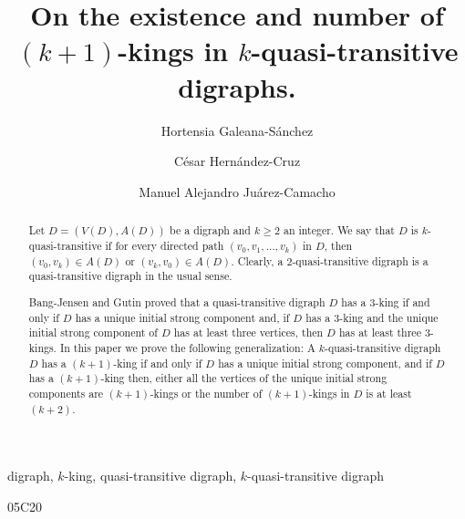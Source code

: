 \documentclass[preprint]{elsarticle}
\begin{document}
\begin{frontmatter}

\title{On the existence and number of $(k+1)$-kings in $k$-quasi-transitive digraphs.}

\author[IMATE]{Hortensia Galeana-S\'anchez}
\author[IMATE]{C\'esar Hern\'andez-Cruz}
\author[FC]{Manuel Alejandro Ju\'arez-Camacho}

\address[IMATE]{Instituto de Matem\'aticas, Universidad Nacional Aut\'onoma de M\'exico, Ciudad Universitaria, C.P. 04510, M\'exico, D.F., M\'exico}
\address[FC]{Facultad de Ciencias, Universidad Nacional Aut\'onoma de M\'exico, Ciudad Universitaria, C.P. 04510, M\'exico, D.F., M\'exico}


\begin{abstract}
Let $D=(V(D), A(D))$ be a digraph and $k \ge 2$ an integer.   We say that $D$ is $k$-quasi-transitive if for every directed path $(v_0, v_1, \dots, v_k)$ in $D$, then $(v_0, v_k) \in A(D)$ or $(v_k, v_0) \in A(D)$.   Clearly, a $2$-quasi-transitive digraph is a quasi-transitive digraph in the usual sense.

Bang-Jensen and Gutin proved that a quasi-transitive digraph $D$ has a $3$-king if and only if $D$ has a unique initial strong component and, if $D$ has a $3$-king and the unique initial strong component of $D$ has at least three vertices, then $D$ has at least three $3$-kings. In this paper we prove the following generalization: A $k$-quasi-transitive digraph $D$ has a $(k+1)$-king if and only if $D$ has a unique initial strong component, and if $D$ has a $(k+1)$-king then, either all the vertices of the unique initial strong components are $(k+1)$-kings or the number of $(k+1)$-kings in $D$ is at least $(k+2)$.
\end{abstract}



\begin{keyword}
digraph, $k$-king, quasi-transitive digraph, $k$-quasi-transitive digraph
\begin{MSC}
05C20
\end{MSC}
\end{keyword}



\end{frontmatter}
\end{document}

